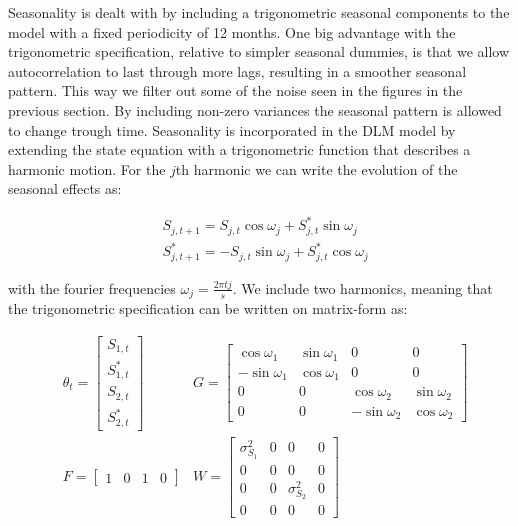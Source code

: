 \documentclass[12pt, a4paper]{article}
\begin{document}
Seasonality is dealt with by including a trigonometric seasonal
components to the model with a fixed periodicity of 12 months. One big
advantage with the trigonometric specification, relative to simpler
seasonal dummies, is that we allow autocorrelation to last through more
lags, resulting in a smoother seasonal pattern. This way we filter out
some of the noise seen in the figures in the previous section. By
including non-zero variances the seasonal pattern is allowed to change
trough time. Seasonality is incorporated in the DLM model by extending
the state equation with a trigonometric function that describes a harmonic motion. For the $j$th harmonic we can write the evolution of the seasonal effects as:


\begin{align}
&S_{j, t+1} = S_{j, t} \cos \omega_{j} + S_{j, t}^{*} \sin \omega_{j} \\ 
&S_{j, t+1}^{*} = - S_{j, t} \sin \omega_{j} + S_{j, t}^{*} \cos \omega_{j}
\end{align}

with the fourier frequencies $\omega_{j} = \frac{2 \pi t j}{s}$. We include two harmonics, meaning that the trigonometric specification can be written on
matrix-form as:

\begin{align*}
   & \theta_{t} = \begin{bmatrix}
    S_{1, t} \\ S_{1, t}^{*} \\ S_{2, t} \\ S_{2, t}^{*}
  \end{bmatrix}
   & G = \begin{bmatrix}
    \cos \omega_{1} & \sin \omega_{1} & 0 & 0 \\ 
    -\sin \omega_{1} & \cos \omega_{1} & 0 & 0 \\
    0 & 0 & \cos \omega_{2} & \sin \omega_{2} \\
    0 & 0 & -\sin \omega_{2} & \cos \omega_{2}
  \end{bmatrix}
   \\
    & F = \begin{bmatrix} 1 & 0 & 1 & 0 \end{bmatrix}   
   & W = \begin{bmatrix}
     \sigma_{S_{1}}^{2} & 0 & 0 & 0 \\
     0 & 0 & 0 & 0 \\
     0 & 0 & \sigma_{S_{2}}^{2} & 0  \\
     0 & 0 & 0 & 0
   \end{bmatrix}
\end{align*}
\end{document}
